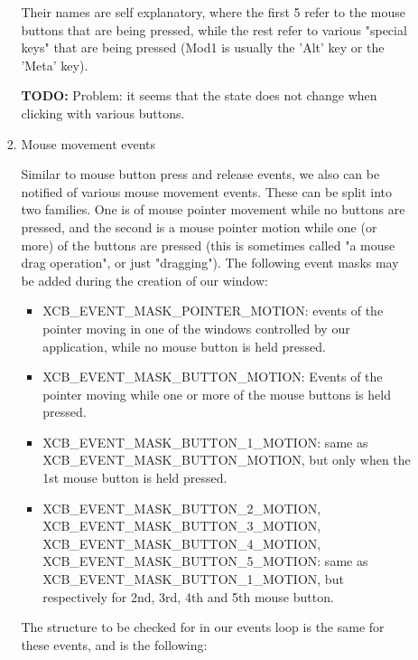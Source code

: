 \documentclass[12pt,oneside,titlepage]{book}
\providecommand{\tightlist}{%
  \setlength{\itemsep}{0pt}\setlength{\parskip}{0pt}}
\begin{document}
\begin{enumerate}
\begin{enumerate}
\begin{enumerate}
      Their names are self explanatory, where the first 5 refer to the
      mouse buttons that are being pressed, while the rest refer to
      various "special keys" that are being pressed (Mod1 is usually the
      'Alt' key or the 'Meta' key).

      \textbf{TODO:} Problem: it seems that the state does not change
      when clicking with various buttons.
    \item
      \protect\hypertarget{mousemvnt}{}{Mouse movement events}

      Similar to mouse button press and release events, we also can be
      notified of various mouse movement events. These can be split into
      two families. One is of mouse pointer movement while no buttons
      are pressed, and the second is a mouse pointer motion while one
      (or more) of the buttons are pressed (this is sometimes called "a
      mouse drag operation", or just "dragging"). The following event
      masks may be added during the creation of our window:

      \begin{itemize}
      \tightlist
      \item
        {XCB\_EVENT\_MASK\_POINTER\_MOTION}: events of the pointer
        moving in one of the windows controlled by our application,
        while no mouse button is held pressed.
      \item
        {XCB\_EVENT\_MASK\_BUTTON\_MOTION}: Events of the pointer moving
        while one or more of the mouse buttons is held pressed.
      \item
        {XCB\_EVENT\_MASK\_BUTTON\_1\_MOTION}: same as
        {XCB\_EVENT\_MASK\_BUTTON\_MOTION}, but only when the 1st mouse
        button is held pressed.
      \item
        {XCB\_EVENT\_MASK\_BUTTON\_2\_MOTION},
        {XCB\_EVENT\_MASK\_BUTTON\_3\_MOTION},
        {XCB\_EVENT\_MASK\_BUTTON\_4\_MOTION},
        {XCB\_EVENT\_MASK\_BUTTON\_5\_MOTION}: same as
        {XCB\_EVENT\_MASK\_BUTTON\_1\_MOTION}, but respectively for 2nd,
        3rd, 4th and 5th mouse button.
      \end{itemize}

      The structure to be checked for in our events loop is the same for
      these events, and is the following:


\end{enumerate}
\end{enumerate}
\end{enumerate}
\end{document}
